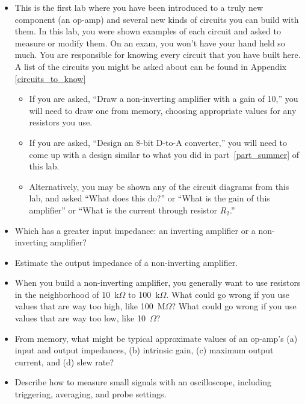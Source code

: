 \begin{itemize}

\item This is the first lab where you have been introduced to a truly new component (an op-amp) and several new kinds of circuits you can build with them.  In this lab, you were shown examples of each circuit and asked to measure or modify them.  On an exam, you won't have your hand held so much.  You are responsible for knowing every circuit that you have built here. A list of the circuits you might be asked about can be found in Appendix \ref{circuits_to_know}

\begin{itemize}
\item If you are asked, ``Draw a non-inverting amplifier with a gain of 10,'' you will need to draw one from memory, choosing appropriate values for any resistors you use.

\item If you are asked, ``Design an 8-bit D-to-A converter,'' you will need to come up with a design similar to what you did in part~\ref{part_summer} of this lab.

\item Alternatively, you may be shown any of the circuit diagrams from this lab, and asked ``What does this do?'' or ``What is the gain of this amplifier'' or ``What is the current through resistor $R_2$.''
\end{itemize}

\item Which has a greater input impedance: an inverting amplifier or a non-inverting amplifier?

\item Estimate the output impedance of a non-inverting amplifier.

\item When you build a non-inverting amplifier, you generally want to use resistors in the neighborhood of 10~k$\Omega$ to 100~k$\Omega$.  What could go wrong if you use values that are way too high, like 100~M$\Omega$?  What could go wrong if you use values that are way too low, like 10~$\Omega$?

\item From memory, what might be typical approximate values of an op-amp's (a) input and output impedances, (b) intrinsic gain, (c) maximum output current, and (d) slew rate?  

\item Describe how to measure small signals with an oscilloscope, including triggering, averaging, and probe settings.

\end{itemize}

